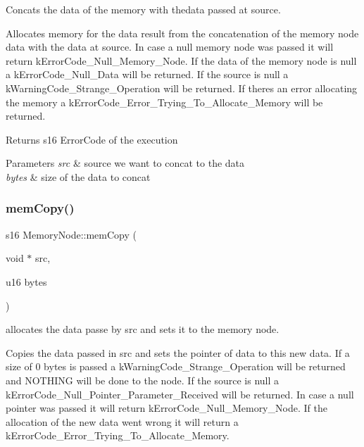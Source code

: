 Concats the data of the memory with thedata passed at source. 

Allocates memory for the data result from the concatenation of the memory node data with the data at source. In case a null memory node was passed it will return k\+Error\+Code\+\_\+\+Null\+\_\+\+Memory\+\_\+\+Node. If the data of the memory node is null a k\+Error\+Code\+\_\+\+Null\+\_\+\+Data will be returned. If the source is null a k\+Warning\+Code\+\_\+\+Strange\+\_\+\+Operation will be returned. If there\textquotesingle{}s an error allocating the memory a k\+Error\+Code\+\_\+\+Error\+\_\+\+Trying\+\_\+\+To\+\_\+\+Allocate\+\_\+\+Memory will be returned. \begin{DoxyReturn}{Returns}
s16 Error\+Code of the execution 
\end{DoxyReturn}

\begin{DoxyParams}{Parameters}
{\em src} & source we want to concat to the data \\
\hline
{\em bytes} & size of the data to concat \\
\hline
\end{DoxyParams}
\mbox{\label{class_memory_node_ae8111a880a8d11ce39d73d841d147a44}} 
\subsubsection{\texorpdfstring{mem\+Copy()}{memCopy()}}
{\footnotesize\ttfamily s16 Memory\+Node\+::mem\+Copy (\begin{DoxyParamCaption}\item[{void $\ast$}]{src,  }\item[{u16}]{bytes }\end{DoxyParamCaption})}



allocates the data passe by src and sets it to the memory node. 

Copies the data passed in src and sets the pointer of data to this new data. If a size of 0 bytes is passed a k\+Warning\+Code\+\_\+\+Strange\+\_\+\+Operation will be returned and N\+O\+T\+H\+I\+NG will be done to the node. If the source is null a k\+Error\+Code\+\_\+\+Null\+\_\+\+Pointer\+\_\+\+Parameter\+\_\+\+Received will be returned. In case a null pointer was passed it will return k\+Error\+Code\+\_\+\+Null\+\_\+\+Memory\+\_\+\+Node. If the allocation of the new data went wrong it will return a k\+Error\+Code\+\_\+\+Error\+\_\+\+Trying\+\_\+\+To\+\_\+\+Allocate\+\_\+\+Memory.

